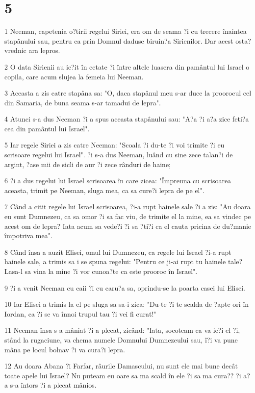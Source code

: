 \chapter{5}

\par 1 Neeman, capetenia o?tirii regelui Siriei, era om de seama ?i cu trecere înaintea stapânului sau, pentru ca prin Domnul daduse biruin?a Sirienilor. Dar acest osta? vrednic ara lepros.
\par 2 O data Sirienii au ie?it în cetate ?i între altele luasera din pamântul lui Israel o copila, care acum slujea la femeia lui Neeman.
\par 3 Aceasta a zis catre stapâna sa: "O, daca stapânul meu s-ar duce la proorocul cel din Samaria, de buna seama s-ar tamadui de lepra".
\par 4 Atunci s-a dus Neeman ?i a spus aceasta stapânului sau: "A?a ?i a?a zice feti?a cea din pamântul lui Israel".
\par 5 Iar regele Siriei a zis catre Neeman: "Scoala ?i du-te ?i voi trimite ?i eu scrisoare regelui lui Israel". ?i s-a dus Neeman, luând cu sine zece talan?i de argint, ?ase mii de sicli de aur ?i zece rânduri de haine;
\par 6 ?i a dus regelui lui Israel scrisoarea în care zicea: "Împreuna cu scrisoarea aceasta, trimit pe Neeman, sluga mea, ca sa cure?i lepra de pe el".
\par 7 Când a citit regele lui Israel scrisoarea, ?i-a rupt hainele sale ?i a zis: "Au doara eu sunt Dumnezeu, ca sa omor ?i sa fac viu, de trimite el la mine, ea sa vindec pe acest om de lepra? Iata acum sa vede?i ?i sa ?ti?i ca el cauta pricina de du?manie împotriva mea".
\par 8 Când însa a auzit Elisei, omul lui Dumnezeu, ca regele lui Israel ?i-a rupt hainele sale, a trimis sa i se spuna regelui: "Pentru ce ji-ai rupt tu hainele tale? Lasa-l sa vina la mine ?i vor cunoa?te ca este prooroc în Israel".
\par 9 ?i a venit Neeman cu caii ?i cu caru?a sa, oprindu-se la poarta casei lui Elisei.
\par 10 Iar Elisei a trimis la el pe sluga sa sa-i zica: "Du-te ?i te scalda de ?apte ori în Iordan, ca ?i se va înnoi trupul tau ?i vei fi curat!"
\par 11 Neeman însa s-a mâniat ?i a plecat, zicând: "Iata, socoteam ca va ie?i el ?i, stând la rugaciune, va chema numele Domnului Dumnezeului sau, î?i va pune mâna pe locul bolnav ?i va cura?i lepra.
\par 12 Au doara Abana ?i Farfar, râurile Damascului, nu sunt ele mai bune decât toate apele lui Israel? Nu puteam eu oare sa ma scald în ele ?i sa ma cura?? ?i a?a s-a întors ?i a plecat mânios.
